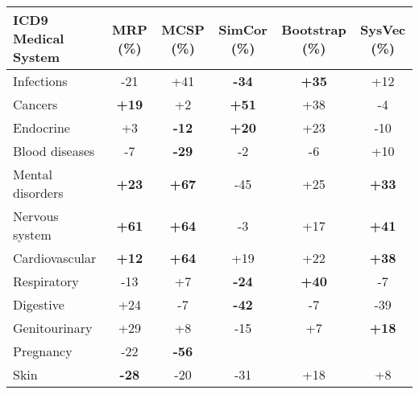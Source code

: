 \documentclass[10pt]{article}
\def\blu#1{{\textbf{\color{blu}#1}}}
\def\ora#1{{\textbf{\color{ora}#1}}}
\begin{document}
\begin{table*}[h]
	\begin{center}
	\label{tab:allsystemresults}
	\begin{tabular}{l|c|c|c|c|c}
		ICD9 Medical System& MRP (\%)                           & MCSP (\%)                         & SimCor (\%)                        & Bootstrap (\%)                    & SysVec (\%)                     \\
		\hline
		Infections           & -21                       & +41                         & \blu{-34} & \ora{+35} & +12                        \\
		Cancers              & \ora{+19}  & +2                         & \ora{+51}  & +38                        & -4                        \\
		Endocrine            & +3                         & \blu{-12} & \ora{+20}  & +23                        & -10                         \\
		Blood diseases       & -7                        & \blu{-29} & -2                         & -6                       & +10                        \\
		Mental disorders     & \ora{+23}   & \ora{+67}  & -45                        & +25                         & \ora{+33} \\
		Nervous system       & \ora{+61}   & \ora{+64}  & -3                        & +17                        & \ora{+41} \\
		Cardiovascular       & \ora{+12}  & \ora{+64}  & +19                         & +22                        & \ora{+38} \\
		Respiratory          & -13                         & +7                         & \blu{-24} & \ora{+40} & -7                        \\
		Digestive            & +24                         & -7                        & \blu{-42} & -7                       & -39                       \\
		Genitourinary        & +29                         & +8                          & -15                        & +7                        & \ora{+18} \\
		Pregnancy            & -22                        & \blu{-56}  &                               &                              &                              \\
		Skin                 & \blu{-28} & -20                        & -31                        & +18                         & +8                        \\

\end{tabular}
\end{center}
\end{table*}
\end{document}
